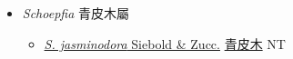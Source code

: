 
  \begin{itemize}
 \item[] \textit{Schoepfia} 青皮木屬
                    
  \begin{itemize}
        \item[] \href{http://www.theplantlist.org/tpl1.1/search?q=Schoepfia+jasminodora}{\textit{S. jasminodora} Siebold \& Zucc.}   \href{\detokenize{http://taibnet.sinica.edu.tw/chi/taibnet_species_list.php?T2=青皮木&T2_new_value=true&fr=y}}{青皮木} NT
  \end{itemize}
  \end{itemize}
